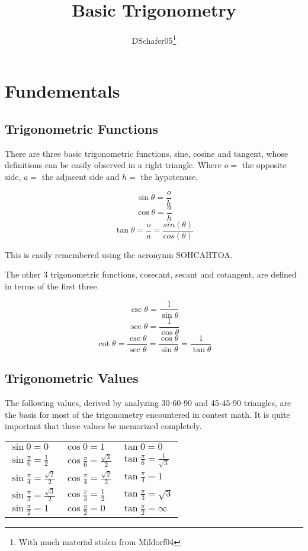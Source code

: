 \documentclass[12pt, letterpaper]{article}
\title{Basic Trigonometry}
\author{DSchafer05\footnote{With much material stolen from Mildorf04}}
\begin{document}
\maketitle

\section{Fundementals}

\subsection{Trigonometric Functions}

\par There are three basic trigonometric functions, sine, cosine and tangent, whose definitions can be easily observed in a right triangle.  Where $o=$ the opposite side, $a=$ the adjacent side and $h=$ the hypotenuse, 

\[
\sin{\theta} = \frac{o}{h}
\]
\[
\cos{\theta} = \frac{a}{h}
\]
\[
\tan{\theta} = \frac{o}{a} = \frac{sin(\theta)}{cos(\theta)}
\]

\par This is easily remembered using the acronynm SOHCAHTOA.

\par The other 3 trigonometric functions, cosecant, secant and cotangent, are defined in terms of the first three.

\[
\csc{\theta} = \frac{1}{\sin{\theta}}
\]
\[
\sec{\theta} = \frac{1}{\cos{\theta}}
\]
\[
\cot{\theta} = \frac{\csc{\theta}}{\sec{\theta}} = \frac{\cos{\theta}}{\sin{\theta}} = \frac{1}{\tan{\theta}}
\]

\subsection{Trigonometric Values}

\par The following values, derived by analyzing 30-60-90 and 45-45-90 triangles, are the basis for most of the trigonometry encountered in contest math.  It is quite important that these values be memorized completely.

\begin{tabular}{lll}
$\sin{0} = 0$ & $\cos{0} = 1$ & $\tan{0} = 0$ \\
$\sin{\frac{\pi}{6}} = \frac{1}{2}$ & $\cos{\frac{\pi}{6}} = \frac{\sqrt{3}}{2}$ & $\tan{\frac{\pi}{6}} = \frac{1}{\sqrt{3}}$ \\
$\sin{\frac{\pi}{4}} = \frac{\sqrt{2}}{2}$ & $\cos{\frac{\pi}{4}} = \frac{\sqrt{2}}{2}$ & $\tan{\frac{\pi}{4}} = 1$ \\
$\sin{\frac{\pi}{3}} = \frac{\sqrt{3}}{2}$ & $\cos{\frac{\pi}{3}} = \frac{1}{2}$ & $\tan{\frac{\pi}{3}} = \sqrt{3}$ \\
$\sin{\frac{\pi}{2}} = 1$ & $\cos{\frac{\pi}{2}} = 0$ & $\tan{\frac{\pi}{2}} = \infty$ \\
\end{tabular}
\end{document}
